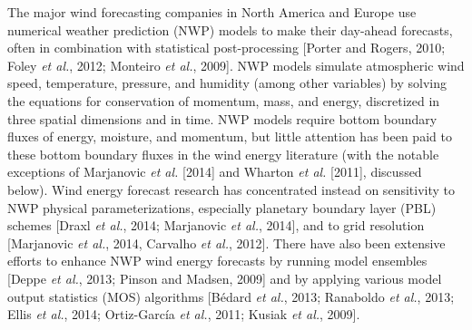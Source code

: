 The major wind forecasting companies in North America and Europe use numerical weather prediction (NWP) models to make their day-ahead forecasts, often in combination with statistical post-processing [Porter and Rogers, 2010; Foley \textit{et al.}, 2012; Monteiro \textit{et al.}, 2009].  NWP models simulate atmospheric wind speed, temperature, pressure, and humidity (among other variables) by solving the equations for conservation of momentum, mass, and energy, discretized in three spatial dimensions and in time.  NWP models require bottom boundary fluxes of energy, moisture, and momentum, but little attention has been paid to these bottom boundary fluxes in the wind energy literature (with the notable exceptions of Marjanovic \textit{et al.} [2014] and Wharton \textit{et al.} [2011], discussed below).  Wind energy forecast research has concentrated instead on sensitivity to NWP physical parameterizations, especially planetary boundary layer (PBL) schemes [Draxl \textit{et al.}, 2014; Marjanovic \textit{et al.}, 2014], and to grid resolution [Marjanovic \textit{et al.}, 2014, Carvalho \textit{et al.}, 2012].  There have also been extensive efforts to enhance NWP wind energy forecasts by running model ensembles [Deppe \textit{et al.}, 2013; Pinson and Madsen, 2009] and by applying various model output statistics (MOS) algorithms [B\'edard \textit{et al.}, 2013; Ranaboldo \textit{et al.}, 2013; Ellis \textit{et al.}, 2014; Ortiz-Garc\'ia \textit{et al.}, 2011; Kusiak \textit{et al.}, 2009].



